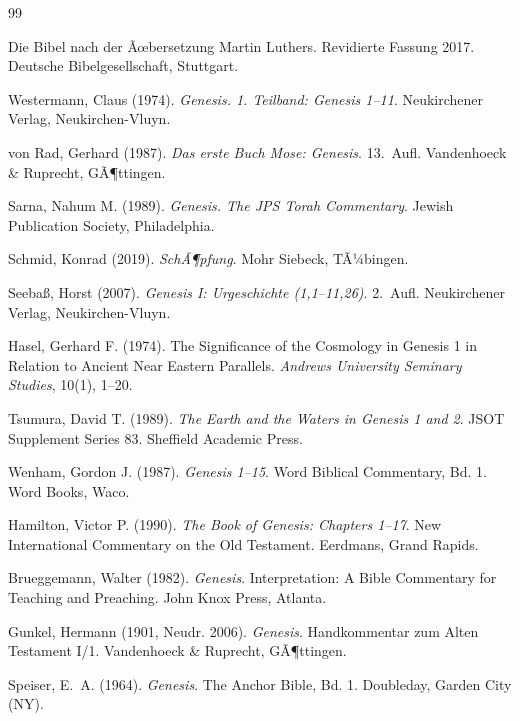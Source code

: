 ﻿\documentclass[a4paper,12pt]{article}
\theoremstyle{definition}
\begin{document}
\begin{thebibliography}{99}
	
	Die Bibel nach der Ãœbersetzung Martin Luthers.
	Revidierte Fassung 2017.
	Deutsche Bibelgesellschaft, Stuttgart.
	
	Westermann, Claus (1974).
	\textit{Genesis. 1. Teilband: Genesis 1--11}.
	Neukirchener Verlag, Neukirchen-Vluyn.
	
	von Rad, Gerhard (1987).
	\textit{Das erste Buch Mose: Genesis}.
	13.~Aufl. Vandenhoeck \& Ruprecht, GÃ¶ttingen.
	
	Sarna, Nahum M. (1989).
	\textit{Genesis. The JPS Torah Commentary}.
	Jewish Publication Society, Philadelphia.
	
	Schmid, Konrad (2019).
	\textit{SchÃ¶pfung}.
	Mohr Siebeck, TÃ¼bingen.
	
	Seeba\ss, Horst (2007).
	\textit{Genesis I: Urgeschichte (1,1--11,26)}.
	2.~Aufl. Neukirchener Verlag, Neukirchen-Vluyn.
	
	Hasel, Gerhard F. (1974).
	The Significance of the Cosmology in Genesis 1 in Relation to Ancient Near
	Eastern Parallels.
	\textit{Andrews University Seminary Studies}, 10(1), 1--20.
	
	Tsumura, David T. (1989).
	\textit{The Earth and the Waters in Genesis 1 and 2}.
	JSOT Supplement Series 83. Sheffield Academic Press.
	
	
	Wenham, Gordon J. (1987).
	\textit{Genesis 1--15}.
	Word Biblical Commentary, Bd. 1. Word Books, Waco.
	
	Hamilton, Victor P. (1990).
	\textit{The Book of Genesis: Chapters 1--17}.
	New International Commentary on the Old Testament.
	Eerdmans, Grand Rapids.
	
	Brueggemann, Walter (1982).
	\textit{Genesis}.
	Interpretation: A Bible Commentary for Teaching and Preaching.
	John Knox Press, Atlanta.
	
	Gunkel, Hermann (1901, Neudr. 2006).
	\textit{Genesis}.
	Handkommentar zum Alten Testament I/1.
	Vandenhoeck \& Ruprecht, GÃ¶ttingen.
	
	Speiser, E.~A. (1964).
	\textit{Genesis}.
	The Anchor Bible, Bd. 1.
	Doubleday, Garden City (NY).
	

\end{thebibliography}
\end{document}
